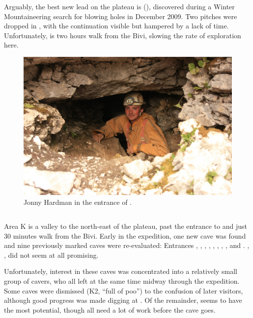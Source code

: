 Arguably, the best new lead on the plateau is  (), discovered during a Winter Mountaineering search for blowing holes in December 2009. Two pitches were dropped in , with the continuation visible but hampered by a lack of time. Unfortunately,  is two hours walk from the Bivi, slowing the rate of exploration here.

\begin{figure}
\checkoddpage \ifoddpage \forcerectofloat \else \forceversofloat \fi
   \centering
\includegraphics[width = \textwidth]{2012/discoveries/2012-08-10-0620-GergelyAmbrus-IMG_2275--N9--orig.jpg}
\caption{Jonny Hardman in the entrance of . } \label{N9 entrance}
\end{figure}

\subsection{}

Area K is a valley to the north-east of the plateau, past the entrance to  and just 30 minutes walk from the Bivi. Early in the expedition, one new cave was found and nine previously marked caves were re-evaluated: Entrances , , , , , , , , and . , ,  did not seem at all promising. 

Unfortunately, interest in these caves was concentrated into a relatively small group of cavers, who all left at the same time midway through the expedition. Some caves were dismissed (K2, “full of poo”) to the confusion of later visitors, although good progress was made digging at . Of the remainder,  seems to have the most potential, though all need a lot of work before the cave goes.


